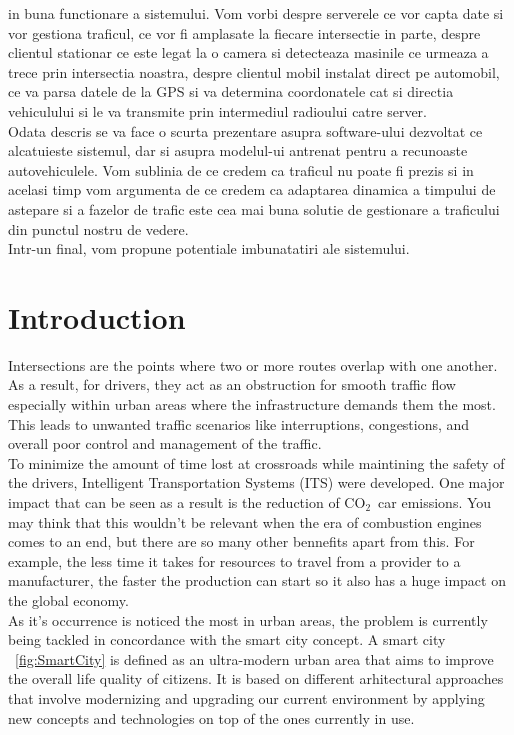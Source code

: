 \documentclass[17pt]{report}
\newcommand{\coo}{\ensuremath{\mathrm{CO_2}}}
\begin{document}
in buna functionare a sistemului. Vom vorbi despre serverele ce vor capta 
date si vor gestiona traficul, ce vor fi amplasate la fiecare intersectie 
in parte, despre clientul stationar ce este legat la o camera si
detecteaza masinile ce urmeaza a trece prin intersectia noastra, despre 
clientul mobil instalat direct pe automobil, ce va parsa datele de la
GPS si va determina coordonatele cat si directia vehiculului si le va 
transmite prin intermediul radioului catre server. \\
\indent \indent 
Odata descris se va face o scurta prezentare asupra software-ului 
dezvoltat ce alcatuieste sistemul, dar si asupra modelul-ui antrenat
pentru a recunoaste autovehiculele. Vom sublinia de ce credem ca
traficul nu poate fi prezis si in acelasi timp vom argumenta de ce
credem ca adaptarea dinamica a timpului de astepare si a fazelor de trafic
este cea mai buna solutie de gestionare a traficului din punctul nostru 
de vedere.\\
\indent \indent
Intr-un final, vom propune potentiale imbunatatiri ale sistemului.
\pagebreak

\tableofcontents

\pagebreak

\listoffigures
\pagebreak

\chapter{Introduction}
\indent \indent
Intersections are the points where two or more
routes overlap with one another. As a result, for drivers, 
they act as an obstruction for smooth traffic
flow especially within urban areas where the
infrastructure demands them the most. This leads to unwanted 
traffic scenarios like interruptions, congestions, and
overall poor control and management of the traffic.\\
\indent \indent
To minimize the amount of time lost at crossroads while
maintining the safety of the drivers, Intelligent
Transportation Systems (ITS) were developed.
One major impact that can be seen as a result is the
reduction of \coo\ car emissions. You may think that
this wouldn't be relevant when the era of combustion
engines comes to an end, but there are so many other
bennefits apart from this. For example, the less time
it takes for resources to travel from a provider to a
manufacturer, the faster the production can start so
it also has a huge impact on the global economy.\\
\indent \indent
As it's occurrence is noticed the most in urban areas,
the problem is currently being tackled in concordance 
with the smart city concept. A smart city ~\ref{fig:SmartCity} is defined as an 
ultra-modern urban area that aims to improve the overall life
quality of citizens. It is based on different arhitectural
approaches that involve modernizing and upgrading our current 
environment by applying new concepts and technologies on top
of the ones currently in use.
\end{document}
